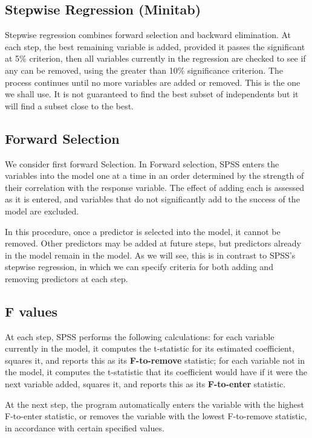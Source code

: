 \subsection{Stepwise Regression (Minitab)}
Stepwise regression combines forward selection and backward elimination. At each
step, the best remaining variable is added, provided it passes the significant at 5\%
criterion, then all variables currently in the regression are checked to see if any can be
removed, using the greater than 10\% significance criterion. The process continues
until no more variables are added or removed. This is the one we shall use. It is not
guaranteed to find the best subset of independents but it will find a subset close to the
best.


\subsection{Forward Selection}
We consider first forward Selection. In Forward selection, SPSS enters the variables into the model one at a time in an
order determined by the strength of their correlation with the response variable. The effect of adding each is assessed as it is entered, and variables that do not significantly add to the success of the model are excluded.

In this procedure, once a predictor is selected into the model, it cannot be removed. Other predictors may be added at future steps, but predictors already in the model remain in the model. As we will see, this is in contrast to SPSS's stepwise regression, in which we can specify criteria for both adding and removing predictors at each step.






\subsection{F values}

At each step, SPSS performs the following calculations: for each variable currently in the model, it computes the t-statistic for its estimated coefficient, squares it, and reports this as its \textbf{F-to-remove} statistic; for each variable not in the model, it computes the t-statistic that its coefficient would have if it were the next variable added, squares it, and reports this as its \textbf{F-to-enter} statistic.

At the next step, the program automatically enters the variable with the highest F-to-enter statistic, or removes the variable with the lowest F-to-remove statistic, in accordance with certain specified values. 

